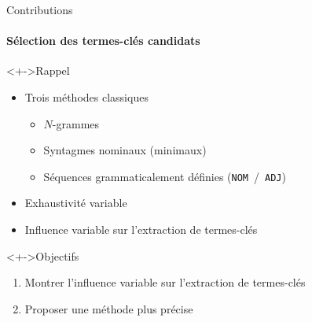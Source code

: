 \begin{frame}{Contributions}\framesubtitle{Sélection des termes-clés candidats}
  \begin{block}<+->{Rappel}
    \begin{itemize}
      \item{Trois méthodes classiques}
      \begin{itemize}
        \item{$N$-grammes}
        \item{Syntagmes nominaux (minimaux)}
        \item{Séquences grammaticalement définies (\texttt{NOM}~/~\texttt{ADJ})}
      \end{itemize}
      \item{Exhaustivité variable}
      \item{Influence variable sur l'extraction de termes-clés}
    \end{itemize}
  \end{block}

  \begin{block}<+->{Objectifs}
    \begin{enumerate}
      \item{Montrer l'influence variable sur l'extraction de termes-clés}
      \item{Proposer une méthode plus précise}
    \end{enumerate}
  \end{block}
\end{frame}

